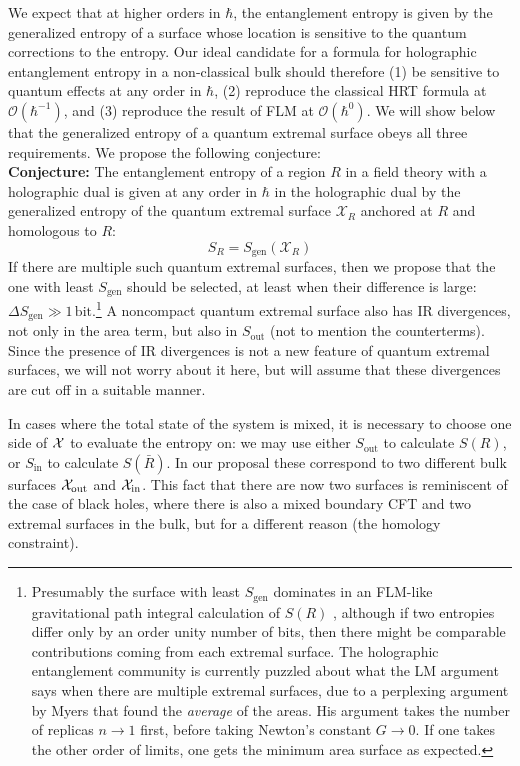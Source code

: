 \documentclass[12pt]{article}
\theoremstyle{remark}
\numberwithin{equation}{section}
\numberwithin{equation}{section}
\begin{document}
We expect that at higher orders in $\hbar$, the entanglement entropy is given by the generalized entropy of a surface whose location is sensitive to the quantum corrections to the entropy.  Our ideal candidate for a formula for holographic entanglement entropy in a non-classical bulk should therefore (1) be sensitive to quantum effects at any order in $\hbar$, (2) reproduce the classical HRT formula at $\mathcal{O}(\hbar^{-1})$, and (3) reproduce the result of FLM at $\mathcal{O}(\hbar^{0})$. We will show below that the generalized entropy of a quantum extremal surface obeys all three requirements. We propose the following conjecture:\\
\textbf{Conjecture:} The entanglement entropy of a region $R$ in a field theory with a holographic dual is given at any order in $\hbar$ in the holographic dual by the generalized entropy of the quantum extremal surface $\mathcal{X}_{R}$ anchored at $R$ and homologous to $R$:
\begin{equation}
S_{R} = S_\mathrm{gen}\left(\mathcal{X}_{R}\right)\label{Ent}
\end{equation}
If there are multiple such quantum extremal surfaces, then we propose that the one with least $S_\mathrm{gen}$ should be selected, at least when their difference is large: $\Delta S_\mathrm{gen} \gg 1\,\mathrm{bit}$.\footnote{Presumably the surface with least $S_\mathrm{gen}$ dominates in an FLM-like gravitational path integral calculation of $S(R)$ \cite{FaulknerLewkowyczMaldacena}, although if two entropies differ only by an order unity number of bits, then there might be comparable contributions coming from each extremal surface.  The holographic entanglement community is currently puzzled about what the LM argument says when there are multiple extremal surfaces, due to a perplexing argument by Myers \cite{Rob, Fischetti:2014zja, Matt} that found the \emph{average} of the areas.  His argument takes the number of replicas $n \to 1$ first, before taking Newton's constant $G \to 0$.  If one takes the other order of limits, one gets the minimum area surface as expected.}
A noncompact quantum extremal surface also has IR divergences, not only in the area term, but also in $S_\mathrm{out}$ (not to mention the counterterms).  Since the presence of IR divergences is not a new feature of quantum extremal surfaces, we will not worry about it here, but will assume that these divergences are cut off in a suitable manner.

In cases where the total state of the system is mixed, it is necessary to choose one side of ${\cal X}$ to evaluate the entropy on: we may use either $S_\mathrm{out}$ to calculate $S(R)$, or $S_\mathrm{in}$ to calculate $S(\bar{R})$.  In our proposal these correspond to two different bulk surfaces ${\cal X}_\mathrm{out}$ and ${\cal X}_\mathrm{in}$.  This fact that there are now two surfaces is reminiscent of the case of black holes, where there is also a mixed boundary CFT and two extremal surfaces in the bulk, but for a different reason (the homology constraint).
\end{document}
